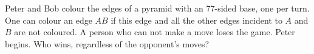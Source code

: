 \problem
Peter and Bob colour the edges of a pyramid with an 77-sided base, one per
turn.
One can colour an edge $AB$ if this edge and all the other edges incident to
$A$ and $B$ are not coloured.
A person who can not make a move loses the game.
Peter begins.
Who wins, regardless of the opponent's moves?
\solution
\endproblem
